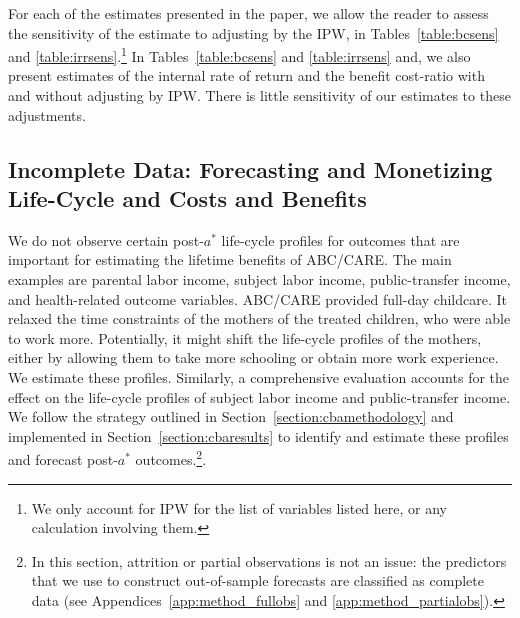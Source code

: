 \noindent For each of the estimates presented in the paper, we allow the reader to assess the sensitivity of the estimate to adjusting by the IPW, in Tables~\ref{table:bcsens} and \ref{table:irrsens}.\footnote{We only account for IPW for the list of variables listed here, or any calculation involving them.} In Tables~\ref{table:bcsens} and \ref{table:irrsens} and, we also present estimates of the internal rate of return and the benefit cost-ratio with and without adjusting by IPW. There is little sensitivity of our estimates to these adjustments.

\subsection{Incomplete Data: Forecasting and Monetizing Life-Cycle and Costs and Benefits} \label{appendix:incomplete}
\label{app:method_noobs}

\noindent We do not observe certain post-$a^*$ life-cycle profiles for outcomes that are important for estimating the lifetime benefits of ABC/CARE. The main examples are parental labor income, subject labor income, public-transfer income, and health-related outcome variables. ABC/CARE provided full-day childcare. It relaxed the time constraints of the mothers of the treated children, who were able to work more. Potentially, it might shift the life-cycle profiles of the mothers, either by allowing them to take more schooling or obtain more work experience. We estimate these profiles. Similarly, a comprehensive evaluation accounts for the effect on the life-cycle profiles of subject labor income and public-transfer income. We follow the strategy outlined in Section~\ref{section:cbamethodology} and implemented in Section~\ref{section:cbaresults} to identify and estimate these profiles and forecast post-$a^\ast$ outcomes.\footnote{In this section, attrition or partial observations is not an issue: the predictors that we use to construct out-of-sample forecasts are classified as complete data (see Appendices~\ref{app:method_fullobs} and \ref{app:method_partialobs}).}.\\


